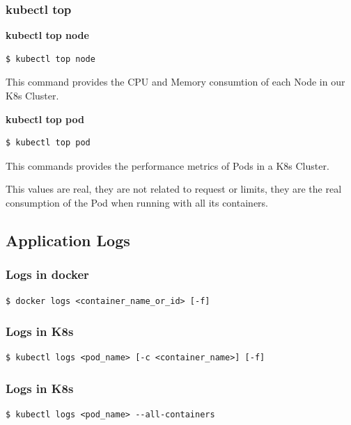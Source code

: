 \documentclass{article}
\newenvironment{blocktemplate}[1]{%
    \tcolorbox[beamer,%
    noparskip,breakable,
    colframe=Blue,%
    colbacklower=LimeGreen!75!LightGreen,%
    title=#1]}%
    {\endtcolorbox}
\newenvironment{codetemplate}[1][]{%
  \mybasecolorbox[#1]
  \itshape
}{%
  \endmybasecolorbox
}
\begin{document}
\subsubsection{kubectl top}
\textbf{kubectl top node}
\begin{codetemplate}{}
\begin{verbatim}
$ kubectl top node
\end{verbatim}
\end{codetemplate}
This command provides the CPU and Memory consumtion of each Node in our K8s Cluster.

\textbf{kubectl top pod}
\begin{codetemplate}{}
\begin{verbatim}
$ kubectl top pod
\end{verbatim}
\end{codetemplate}
This commands provides the performance metrics of Pods in a K8s Cluster.

\begin{blocktemplate}{NOTE}
This values are real, they are not related to request or limits, they are the real consumption of the Pod when running with all its containers.
\end{blocktemplate}

\subsection{Application Logs}

\subsubsection{Logs in docker}
\begin{codetemplate}{}
\begin{verbatim}
$ docker logs <container_name_or_id> [-f]
\end{verbatim}
\end{codetemplate}

\subsubsection{Logs in K8s}
\begin{codetemplate}{}
\begin{verbatim}
$ kubectl logs <pod_name> [-c <container_name>] [-f]
\end{verbatim}
\end{codetemplate}

\subsubsection{Logs in K8s}
\begin{codetemplate}{}
\begin{verbatim}
$ kubectl logs <pod_name> --all-containers
\end{verbatim}
\end{codetemplate}
\end{document}
